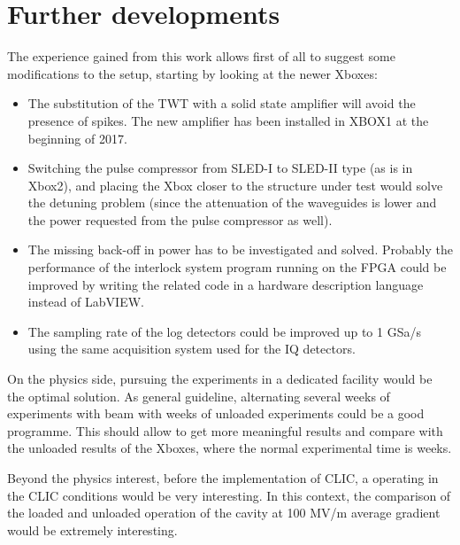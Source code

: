 \section[Further developments]{Further developments}

The experience gained from this work allows first of all to suggest some modifications to the setup, starting by looking at the newer Xboxes:
\begin{itemize}
\item The substitution of the TWT with a solid state amplifier will avoid the presence of spikes. The new amplifier has been installed in XBOX1 at the beginning of 2017.
\item Switching the pulse compressor from SLED-I to SLED-II type (as is in Xbox2), and placing the Xbox closer to the structure under test would solve the detuning problem (since the attenuation of the waveguides is lower and the power requested from the pulse compressor as well).
\item The missing back-off in power has to be investigated and solved. Probably the performance of the interlock system program running on the FPGA could be improved by writing the related code in a hardware description language instead of LabVIEW.
\item The sampling rate of the log detectors could be improved up to 1 GSa/s using the same acquisition system used for the IQ detectors.
\end{itemize}

On the physics side, pursuing the experiments in a dedicated facility would be the optimal solution. As general guideline, alternating several weeks of experiments with beam with weeks of unloaded experiments could be a good programme. This should allow to get more meaningful results and compare with the unloaded results of the Xboxes, where the normal experimental time is weeks.

Beyond the physics interest, before the implementation of CLIC, a operating in the CLIC conditions would be very interesting. In this context, the comparison of the loaded and unloaded operation of the cavity at 100 MV/m average gradient would be extremely interesting.